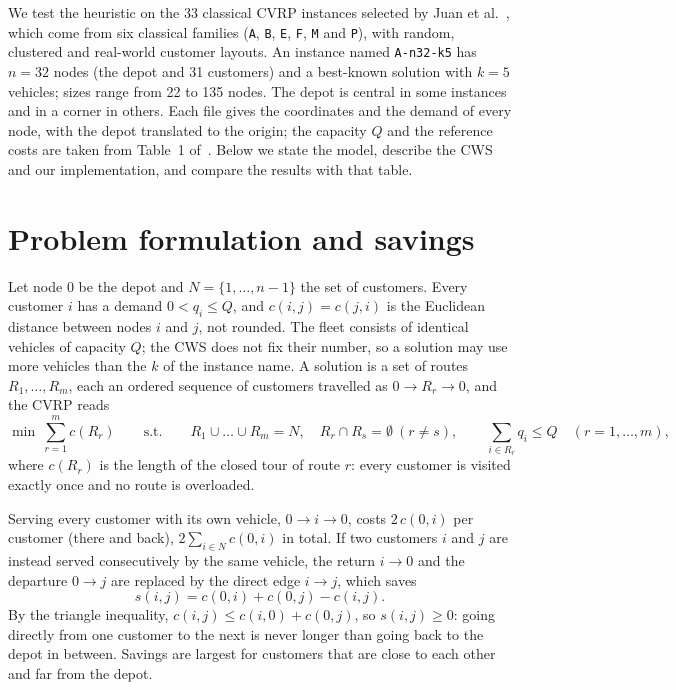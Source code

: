\documentclass[10pt,a4paper]{article}
\begin{document}
We test the heuristic on the 33 classical CVRP instances selected by Juan et al.~\cite{juan2011}, which
come from six classical families (\texttt{A}, \texttt{B}, \texttt{E}, \texttt{F}, \texttt{M} and
\texttt{P}), with random, clustered and real-world customer layouts. An instance named \texttt{A-n32-k5} has $n=32$
nodes (the depot and 31 customers) and a best-known solution with $k=5$ vehicles; sizes range from 22 to
135 nodes. The depot is central in some instances and in a corner in others. Each file gives the coordinates and the demand of every node, with the
depot translated to the origin; the capacity $Q$ and the reference costs are taken from Table~1
of~\cite{juan2011}. Below we state the model, describe the CWS and our implementation, and compare the results with
that table.

\section{Problem formulation and savings}
\label{sec:model}

Let node $0$ be the depot and $N=\{1,\dots,n-1\}$ the set of customers. Every customer $i$ has a demand
$0<q_i\le Q$, and $c(i,j)=c(j,i)$ is the Euclidean distance between nodes $i$ and $j$, not rounded. The
fleet consists of identical vehicles of capacity $Q$; the CWS does not fix their number, so a solution
may use more vehicles than the $k$ of the instance name. A solution is a set of routes $R_1,\dots,R_m$,
each an ordered sequence of customers travelled as $0\to R_r\to0$, and the CVRP reads
\begin{equation}
\min\ \sum_{r=1}^{m} c(R_r)
\qquad\text{s.t.}\qquad
R_1\cup\dots\cup R_m = N,\quad R_r\cap R_s=\emptyset\ (r\neq s),\qquad
\sum_{i\in R_r} q_i\le Q\quad (r=1,\dots,m),
\label{eq:cvrp}
\end{equation}
where $c(R_r)$ is the length of the closed tour of route $r$: every customer is visited exactly once and
no route is overloaded.

Serving every customer with its own vehicle, $0\to i\to0$, costs $2\,c(0,i)$ per customer (there and
back), $2\sum_{i\in N}c(0,i)$ in total. If two customers $i$ and $j$ are instead served consecutively by the same vehicle,
the return $i\to0$ and the departure $0\to j$ are replaced by the direct edge $i\to j$, which saves
\begin{equation}
s(i,j) = c(0,i) + c(0,j) - c(i,j).
\label{eq:savings}
\end{equation}
By the triangle inequality, $c(i,j)\le c(i,0)+c(0,j)$, so $s(i,j)\ge0$: going directly from one customer
to the next is never longer than going back to the depot in between. Savings are largest for customers
that are close to each other and far from the depot.
\end{document}
